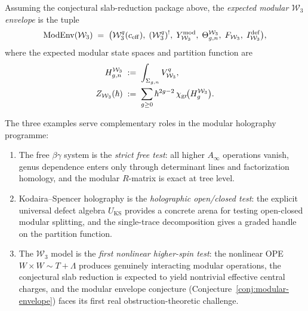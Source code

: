 \begin{definition}
Assuming the conjectural slab-reduction package above, the
\emph{expected modular $\mathcal{W}_3$ envelope} is the tuple
\begin{equation}
\operatorname{ModEnv}(\mathcal{W}_3)
\;=\;
\bigl(\mathcal{W}_3^q(c_{\mathrm{eff}}),\;
(\mathcal{W}_3^q)^!,\;
Y_{\mathcal{W}_3}^{\mathrm{mod}},\;
\Theta_{g,n}^{\mathcal{W}_3},\;
F_{\mathcal{W}_3},\;
I_{\mathcal{W}_3}^{\mathrm{def}}\bigr),
\end{equation}
where the expected modular state spaces and partition function are
\begin{align}
H_{g,n}^{\mathcal{W}_3}
&\;:=\;
\int_{\Sigma_{g,n}} V_{\mathcal{W}_3}^q,
\\
Z_{\mathcal{W}_3}(\hbar)
&\;:=\;
\sum_{g \geq 0} \hbar^{2g-2}\,\chi_{\operatorname{gr}}\!\bigl(H_g^{\mathcal{W}_3}\bigr).
\end{align}
\end{definition}

\begin{remark}
The three examples serve complementary roles in the modular holography programme:
\begin{enumerate}[label=\textup{(\roman*)}]
\item The free $\beta\gamma$ system is the \emph{strict free test}: all higher
 $A_\infty$ operations vanish, genus dependence enters only through determinant lines
 and factorization homology, and the modular $R$-matrix is exact at tree level.
\item Kodaira--Spencer holography is the \emph{holographic open/closed test}: the
 explicit universal defect algebra $U_{\mathrm{KS}}$ provides a concrete arena for
 testing open-closed modular splitting, and the single-trace decomposition gives a
 graded handle on the partition function.
\item The $\mathcal{W}_3$ model is the \emph{first nonlinear higher-spin test}: the
 nonlinear OPE $W \times W \sim T + \Lambda$ produces genuinely interacting modular
 operations, the conjectural slab reduction is expected to yield nontrivial effective central charges, and the
 modular envelope conjecture (Conjecture~\ref{conj:modular-envelope}) faces its first
 real obstruction-theoretic challenge.
\end{enumerate}
\end{remark}

